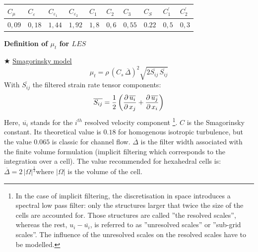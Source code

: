 
\begin{center}
\begin{tabular}{|p{}|p{}|p{}|p{}|p{}|p{}|p{}|p{}|p{}|p{}|}
\hline
$C_\mu$ & $C_{\varepsilon}$ & $C_{\varepsilon_1}$ & $C_{\varepsilon_2}$ & $%
C_1$ & $C_2$ & $C_3$ & $C_S$ & $C^{\prime}_1$ & $C^{\prime}_2$ \\ \hline
$0,09$ & $0,18$ & $1,44$ & $1,92$ & $1,8$ & $0,6$ & $0,55$ & $0.22$ & $0,5$
& $0,3$ \\ \hline
\end{tabular}
\end{center}


\clearpage \textbf{Definition of $\mu_t$ for $LES$}

{\tiny $\bigstar $} \underline{Smagorinsky model}
\begin{equation}
\mu _{t}=\rho \,(C_{s}\,\overline{\Delta })^{2}\sqrt{2\overline{S_{ij}}\,%
\overline{S_{ij}}}
\end{equation}%
With $\overline{S_{ij}}$ the filtered strain rate tensor components:
\begin{equation}
\overline{S_{ij}}=\frac{1}{2}\left( \frac{\partial \,\overline{u_{i}}}{%
\partial \,x_{j}}+\frac{\partial \,\overline{u_{j}}}{\partial \,x_{i}}%
\right)
\end{equation}%
Here, $\overline{u_{i}}$ stands for the $i^{th}$ resolved velocity component%
\footnote{%
In the case of implicit filtering, the discretisation in space introduces a
spectral low pass filter: only the structures larger that twice the size of
the cells are accounted for. Those structures are called ''the resolved
scales'', whereas the rest, $u_{i}-\overline{u_{i}}$, is referred to as
''unresolved scales'' or ''sub-grid scales''. The influence of the
unresolved scales on the resolved scales have to be modelled.}. \newline
\newline
$C$ is the Smagorinsky constant. Its theoretical value is $0.18$ for
homogenous isotropic turbulence, but the value $0.065$ is classic for
channel flow. \newline
\newline
$\overline{\Delta }$ is the filter width associated with the finite volume
formulation (implicit filtering which corresponds to the integration over a
cell). The value recommended for hexahedral cells is: $\overline{\Delta }%
=2\,|\Omega |^{\frac{1}{3}}$where $|\Omega |$ is the volume of the cell.

